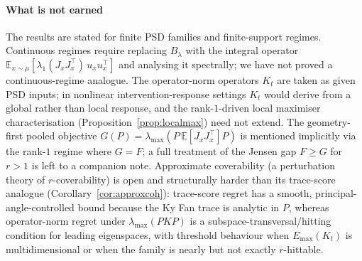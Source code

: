 \documentclass[final,3p,times]{elsarticle}
\newcommand{\E}{\mathbb{E}}
\newcommand{\Emax}{E_{\max}}
\begin{document}
\paragraph{What is not earned}
The results are stated for finite PSD families and finite-support
regimes.
Continuous regimes require replacing $B_\lambda$ with the integral
operator
$\E_{x\sim\mu}[\lambda_1(J_xJ_x^\top)\,u_xu_x^\top]$ and analysing it
spectrally; we have not proved a continuous-regime analogue.
The operator-norm operators $K_t$ are taken as given PSD inputs; in
nonlinear intervention-response settings $K_t$ would derive from a
global rather than local response, and the rank-$1$-driven local
maximiser characterisation (Proposition~\ref{prop:localmax}) need not
extend.
The geometry-first pooled objective $G(P)=\lambda_{\max}(P\,\E[J_xJ_x^\top]P)$
is mentioned implicitly via the rank-$1$ regime where $G=F$; a full
treatment of the Jensen gap $F\ge G$ for $r>1$ is left to a companion
note.
Approximate coverability (a perturbation theory of $r$-coverability) is
open and structurally harder than its trace-score analogue
(Corollary~\ref{cor:approxcoh}): trace-score regret has a smooth,
principal-angle-controlled bound because the Ky Fan trace is analytic
in $P$, whereas operator-norm regret under $\lambda_{\max}(PKP)$ is a
subspace-transversal/hitting condition for leading eigenspaces, with
threshold behaviour when $\Emax(K_t)$ is multidimensional or when the
family is nearly but not exactly $r$-hittable.
\end{document}
